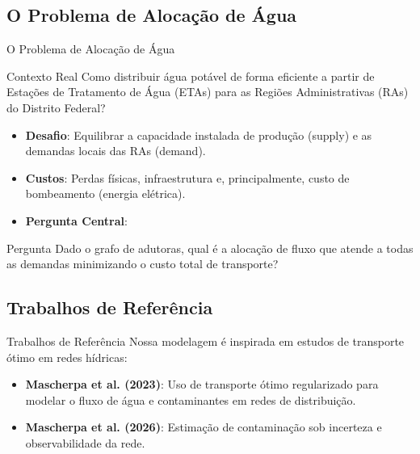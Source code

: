 \subsection{O Problema de Alocação de Água}
\begin{frame}[shrink=5]{O Problema de Alocação de Água}
  \begin{block}{Contexto Real}
    Como distribuir água potável de forma eficiente a partir de Estações de Tratamento de Água (ETAs) para as Regiões Administrativas (RAs) do Distrito Federal?
  \end{block}
  
  \begin{itemize}
    \item \textbf{Desafio}: Equilibrar a capacidade instalada de produção (supply) e as demandas locais das RAs (demand).
    \item \textbf{Custos}: Perdas físicas, infraestrutura e, principalmente, custo de bombeamento (energia elétrica).
    \item \textbf{Pergunta Central}:
  \end{itemize}

  \begin{exampleblock}{Pergunta}
    Dado o grafo de adutoras, qual é a alocação de fluxo que atende a todas as demandas minimizando o custo total de transporte?
  \end{exampleblock}
\end{frame}

\subsection{Trabalhos de Referência}
\begin{frame}{Trabalhos de Referência}
  Nossa modelagem é inspirada em estudos de transporte ótimo em redes hídricas:
  
  \begin{itemize}
    \setlength{\itemsep}{15pt}
    \item \textbf{Mascherpa et al. (2023)}:
      Uso de transporte ótimo regularizado para modelar o fluxo de água e contaminantes em redes de distribuição.
    \item \textbf{Mascherpa et al. (2026)}:
      Estimação de contaminação sob incerteza e observabilidade da rede.
  \end{itemize}
\end{frame}

